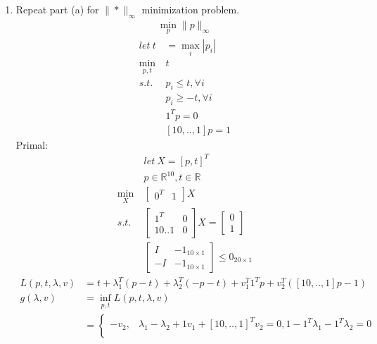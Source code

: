 \documentclass[12pt,letter]{article}
\newcommand{\R}{\mathbb{R}}
\newcommand{\norm}[1]{\|#1\|}
\begin{document}
\begin{enumerate}
\begin{enumerate}
\begin{enumerate}
    \end{enumerate}
    \pagebreak
  \item Repeat part (a) for $\norm{\ast}_{\infty}$ minimization problem.
    \begin{align*}
      \min_{p} \norm{p}_{\infty}
    \end{align*}
    \begin{align*}
      let\ t&=\max_i |p_i|\\
      \min_{p,t}\ & t\\
      s.t.\ & p_i \leq t, \forall i\\
                 & p_i \geq -t, \forall i\\
                 &1^Tp=0\\
                 &[10,..,1]p = 1
    \end{align*}
    Primal:
    \begin{align*}
      &let\ X=[p,t]^T\\
      &p\in\R^{10},t\in\R\\
      \min_{X}\ &
                  \begin{bmatrix}
                    0^T & 1
                  \end{bmatrix} X\\
      s.t.\ &
              \begin{bmatrix}
                1^T & 0\\
                10..1 & 0
              \end{bmatrix} X =
                        \begin{bmatrix}
                          0\\1
                        \end{bmatrix}\\
      &
        \begin{bmatrix}
          I & -1_{10\times 1}\\
          -I & -1_{10\times 1}
        \end{bmatrix} \leq 0_{20\times 1}
    \end{align*}
    \pagebreak
    \begin{align*}
      L(p,t,\lambda,v) &= t + \lambda_1^T(p-t) + \lambda_2^T(-p-t) + v_1^T1^Tp + v_2^T([10,..,1]p-1)\\
      g(\lambda,v) &= \inf_{p,t} L(p,t,\lambda,v)\\
                       &=
                         \begin{cases}
                           -v_2, & \lambda_1 - \lambda_2 + 1v_1 + [10,..,1]^Tv_2 = 0, 1-1^T\lambda_1-1^T\lambda_2 = 0\\

\end{cases}
\end{align*}
\end{enumerate}
\end{enumerate}
\end{document}
